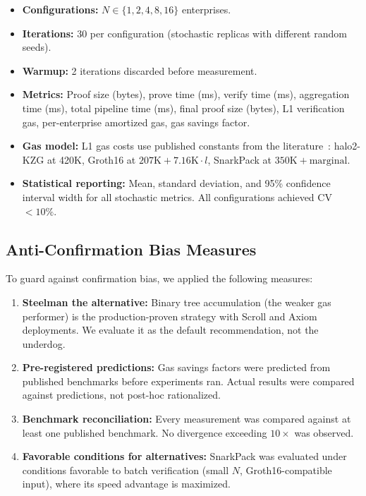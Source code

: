 \begin{itemize}
  \item \textbf{Configurations:} $N \in \{1, 2, 4, 8, 16\}$ enterprises.
  \item \textbf{Iterations:} 30 per configuration (stochastic replicas
    with different random seeds).
  \item \textbf{Warmup:} 2 iterations discarded before measurement.
  \item \textbf{Metrics:} Proof size (bytes), prove time (ms), verify
    time (ms), aggregation time (ms), total pipeline time (ms), final
    proof size (bytes), L1 verification gas, per-enterprise amortized
    gas, gas savings factor.
  \item \textbf{Gas model:} L1 gas costs use published constants from
    the literature~\cite{orbiter-gas, nebra-gas}: halo2-KZG at 420K,
    Groth16 at $207\text{K} + 7.16\text{K} \cdot l$, SnarkPack at
    $350\text{K} + \text{marginal}$.
  \item \textbf{Statistical reporting:} Mean, standard deviation, and
    95\% confidence interval width for all stochastic metrics. All
    configurations achieved CV $< 10\%$.
\end{itemize}

\subsection{Anti-Confirmation Bias Measures}

To guard against confirmation bias, we applied the following measures:

\begin{enumerate}
  \item \textbf{Steelman the alternative:} Binary tree accumulation
    (the weaker gas performer) is the production-proven strategy with
    Scroll and Axiom deployments. We evaluate it as the default
    recommendation, not the underdog.
  \item \textbf{Pre-registered predictions:} Gas savings factors were
    predicted from published benchmarks before experiments ran. Actual
    results were compared against predictions, not post-hoc rationalized.
  \item \textbf{Benchmark reconciliation:} Every measurement was
    compared against at least one published benchmark. No divergence
    exceeding $10\times$ was observed.
  \item \textbf{Favorable conditions for alternatives:} SnarkPack was
    evaluated under conditions favorable to batch verification (small
    $N$, Groth16-compatible input), where its speed advantage is
    maximized.
\end{enumerate}

